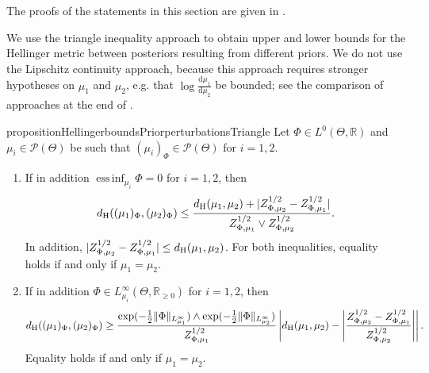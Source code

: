 \documentclass[a4paper]{scrartcl}
\theoremstyle{definition}
\numberwithin{equation}{section}
\newcommand{\R}{\mathbb{R}}
\newcommand{\rd}{\mathrm{d}}
\DeclareMathOperator*{\essinf}{ess\,inf}
\newcommand{\abs}[1]{\vert #1\vert}
\newcommand{\Abs}[1]{\left\vert#1\right\vert}
\newcommand{\norm}[1]{\Vert #1 \Vert}
\newcommand{\Hel}[0]{\textup{H}}
\begin{document}
The proofs of the statements in this section are given in .

We use the triangle inequality approach to obtain upper and lower bounds for the Hellinger metric between posteriors resulting from different priors.
We do not use the Lipschitz continuity approach, because this approach requires stronger hypotheses on $\mu_1$ and $\mu_2$, e.g. that $\log \tfrac{\rd\mu_1}{\rd\mu_2}$ be bounded; see the comparison of approaches at the end of . 
\begin{restatable}{proposition}{HellingerboundsPriorperturbationsTriangle}
 \label{proposition_Hellinger_bounds_prior_perturbation_via_triangle_inequality}
 Let $\Phi\in L^0(\Theta,\R)$ and $\mu_i\in\mathcal{P}(\Theta)$ be such that $(\mu_i)_\Phi\in \mathcal{P}(\Theta)$ for $i=1,2$.
 \begin{enumerate}
\item \label{proposition_Hellinger_bound_prior_perturbation_upper_bound}

If in addition $\essinf_{\mu_i}\Phi=0$ for $i=1,2$, then
\begin{equation*}
 d_{\Hel}((\mu_1)_\Phi,(\mu_2)_\Phi)\leq 
\frac{d_{\Hel}(\mu_1,\mu_2)+\abs{Z_{\Phi,\mu_2}^{1/2}-Z_{\Phi,\mu_1}^{1/2}}}{Z_{\Phi,\mu_1}^{1/2}\vee Z_{\Phi,\mu_2}^{1/2}}.
\end{equation*}
In addition, $\abs{Z_{\Phi,\mu_2}^{1/2}-Z_{\Phi,\mu_1}^{1/2}}\leq d_{\Hel}(\mu_1,\mu_2)$.
For both inequalities, equality holds if and only if $\mu_1=\mu_2$. 

\item \label{proposition_Hellinger_bound_prior_perturbation_lower_bound}
If in addition $\Phi\in L^\infty_{\mu_i}(\Theta,\R_{\geq 0})$ for $i=1,2$, then
\begin{equation*}
 d_{\Hel}((\mu_1)_\Phi,(\mu_2)_\Phi)\geq \frac{\exp(-\tfrac{1}{2}\norm{\Phi}_{L^\infty_{\mu_1}})\wedge \exp(-\tfrac{1}{2}\norm{\Phi}_{L^\infty_{\mu_2}})}{Z_{\Phi,\mu_1}^{1/2}}\Abs{d_{\Hel}(\mu_1,\mu_2)-\Abs{\frac{Z_{\Phi,\mu_2}^{1/2}-Z_{\Phi,\mu_1}^{1/2}}{Z_{\Phi,\mu_2}^{1/2} }}}.
\end{equation*}
Equality holds if and only if $\mu_1=\mu_2$.
\end{enumerate}
\end{restatable}
\end{document}
